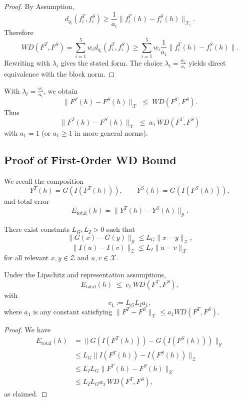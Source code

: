 \documentclass[11pt]{article}
\theoremstyle{definition}
\theoremstyle{plain}
\theoremstyle{remark}
\begin{document}
\begin{proof}
By Assumption,
\[
  d_{q_i}(f_i^T,f_i^S) \ge \frac{1}{a_i}\|f_i^T(h)-f_i^S(h)\|_{\mathcal{X}_i}.
\]
Therefore
\[
  WD(F^T,F^S)
  =
  \sum_{i=1}^5 w_i d_{q_i}(f_i^T,f_i^S)
  \ge
  \sum_{i=1}^5 w_i \frac{1}{a_i} \|f_i^T(h)-f_i^S(h)\|.
\]
Rewriting with \(\lambda_i\) gives the stated form. The choice \(\lambda_i = \frac{w_i}{a_i}\) yields direct equivalence with the block norm.
\end{proof}

\begin{acor}
With \(\lambda_i = \frac{w_i}{a_i}\), we obtain
\[
  \|F^T(h)-F^S(h)\|_{\mathcal{X}}
  \;\le\;
  WD(F^T,F^S).
\]
Thus
\[
  \|F^T(h)-F^S(h)\|_{\mathcal{X}}
  \;\le\;
  a_1\, WD(F^T,F^S)
\]
with \(a_1=1\) (or \(a_1\ge1\) in more general norms).
\end{acor}

\subsection{Proof of First-Order WD Bound}

We recall the composition
\[
  Y^T(h) = G(I(F^T(h))),
  \qquad
  Y^S(h) = G(I(F^S(h))),
\]
and total error
\[
  E_{\text{total}}(h) = \|Y^T(h) - Y^S(h)\|_{\mathcal{Y}}.
\]

\begin{aassump}
There exist constants \(L_G, L_I > 0\) such that
\[
  \|G(x) - G(y)\|_{\mathcal{Y}} \le L_G \|x-y\|_{\mathcal{Z}},
\]
\[
  \|I(u) - I(v)\|_{\mathcal{Z}} \le L_I \|u-v\|_{\mathcal{X}}
\]
for all relevant \(x,y\in\mathcal{Z}\) and \(u,v\in\mathcal{X}\).
\end{aassump}

\begin{athm}
Under the Lipschitz and representation assumptions,
\[
  E_{\text{total}}(h)
  \;\le\;
  c_1 \, WD(F^T,F^S),
\]
with
\[
  c_1 := L_G L_I a_1,
\]
where \(a_1\) is any constant satisfiying \(\|F^T-F^S\|_{\mathcal{X}} \le a_1 WD(F^T,F^S)\).
\end{athm}

\begin{proof}
We have
\begin{align*}
  E_{\text{total}}(h)
  &= \|G(I(F^T(h))) - G(I(F^S(h)))\|_{\mathcal{Y}} \\
  &\le L_G \|I(F^T(h)) - I(F^S(h))\|_{\mathcal{Z}} \\
  &\le L_I L_G \|F^T(h)-F^S(h)\|_{\mathcal{X}} \\
  &\le L_I L_G a_1 \, WD(F^T,F^S),
\end{align*}
as claimed.
\end{proof}
\end{document}
